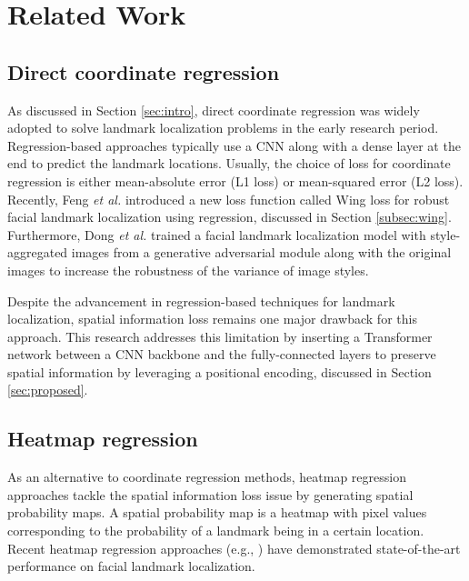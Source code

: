 \documentclass[journal]{IEEEtran}
\begin{document}
\section{Related Work}\label{sec:related}

\subsection{Direct coordinate regression}\label{subsec:direct}
As discussed in Section \ref{sec:intro}, direct coordinate regression was widely adopted to solve landmark localization problems in the early research period.
Regression-based approaches \cite{Sun2013, Zhang2014, zhang2014facial, ZhangLuo2016, Ranjan2016, Feng2017, Xuanyi2018} typically use a CNN along with a dense layer at the end to predict the landmark locations. 
Usually, the choice of loss for coordinate regression is either mean-absolute error (L1 loss) or mean-squared error (L2 loss).
Recently, Feng \textit{et al.} \cite{Feng2017} introduced a new loss function called Wing loss for robust facial landmark localization using regression, discussed in Section \ref{subsec:wing}.
Furthermore, Dong \textit{et al.} \cite{Xuanyi2018} trained a facial landmark localization model with style-aggregated images from a generative adversarial module along with the original images to increase the robustness of the variance of image styles.

Despite the advancement in regression-based techniques for landmark localization, spatial information loss remains one major drawback for this approach.
This research addresses this limitation by inserting a Transformer network between a CNN backbone and the fully-connected layers to preserve spatial information by leveraging a positional encoding, discussed in Section \ref{sec:proposed}.

\subsection{Heatmap regression}\label{subsec:heat}
As an alternative to coordinate regression methods, heatmap regression approaches tackle the spatial information loss issue by generating spatial probability maps. 
A spatial probability map is a heatmap with pixel values corresponding to the probability of a landmark being in a certain location.
Recent heatmap regression approaches (e.g., \cite{Kowalski2017, Mahpod2018, Wu2018, Sun2019HighResolutionRF, Kumar2020}) have demonstrated state-of-the-art performance on facial landmark localization. 
\end{document}
